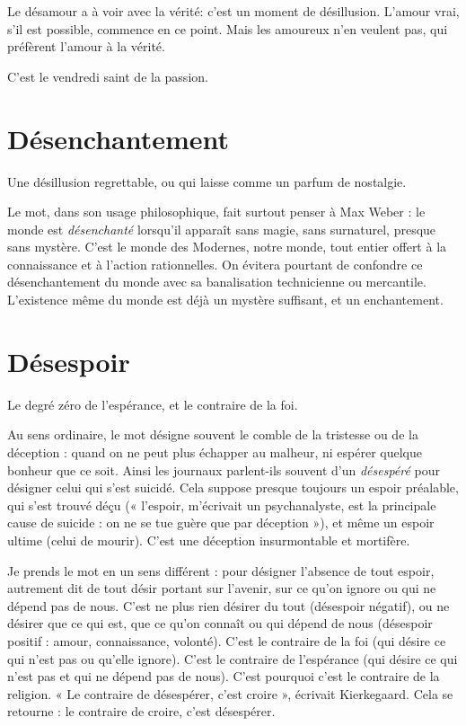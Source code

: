 Le désamour a à voir avec la vérité: c’est un moment de désillusion.
L'amour vrai, s’il est possible, commence en ce point. Mais les amoureux n’en
veulent pas, qui préfèrent l’amour à la vérité.

C’est le vendredi saint de la passion.

\section{Désenchantement}
Une désillusion regrettable, ou qui laisse comme
un parfum de nostalgie.

Le mot, dans son usage philosophique, fait surtout penser à Max Weber :
le monde est {\it désenchanté} lorsqu'il apparaît sans magie, sans surnaturel, presque
sans mystère. C’est le monde des Modernes, notre monde, tout entier offert à
la connaissance et à l’action rationnelles. On évitera pourtant de confondre ce
désenchantement du monde avec sa banalisation technicienne ou mercantile.
L'existence même du monde est déjà un mystère suffisant, et un enchantement.

\section{Désespoir}
Le degré zéro de l'espérance, et le contraire de la foi.

Au sens ordinaire, le mot désigne souvent le comble de la tristesse ou de la
déception : quand on ne peut plus échapper au malheur, ni espérer quelque
bonheur que ce soit. Ainsi les journaux parlent-ils souvent d’un {\it désespéré} pour
désigner celui qui s’est suicidé. Cela suppose presque toujours un espoir préalable,
qui s’est trouvé déçu (« l'espoir, m’écrivait un psychanalyste, est la principale
cause de suicide : on ne se tue guère que par déception »), et même un
espoir ultime (celui de mourir). C’est une déception insurmontable et mortifère.

Je prends le mot en un sens différent : pour désigner l’absence de tout
espoir, autrement dit de tout désir portant sur l'avenir, sur ce qu’on ignore ou
qui ne dépend pas de nous. C’est ne plus rien désirer du tout (désespoir
négatif), ou ne désirer que ce qui est, que ce qu’on connaît ou qui dépend de
nous (désespoir positif : amour, connaissance, volonté). C’est le contraire de la
foi (qui désire ce qui n’est pas ou qu’elle ignore). C’est le contraire de l’espérance
(qui désire ce qui n’est pas et qui ne dépend pas de nous). C’est pourquoi
c’est le contraire de la religion. « Le contraire de désespérer, c’est croire », écrivait
Kierkegaard. Cela se retourne : le contraire de croire, c’est désespérer.

